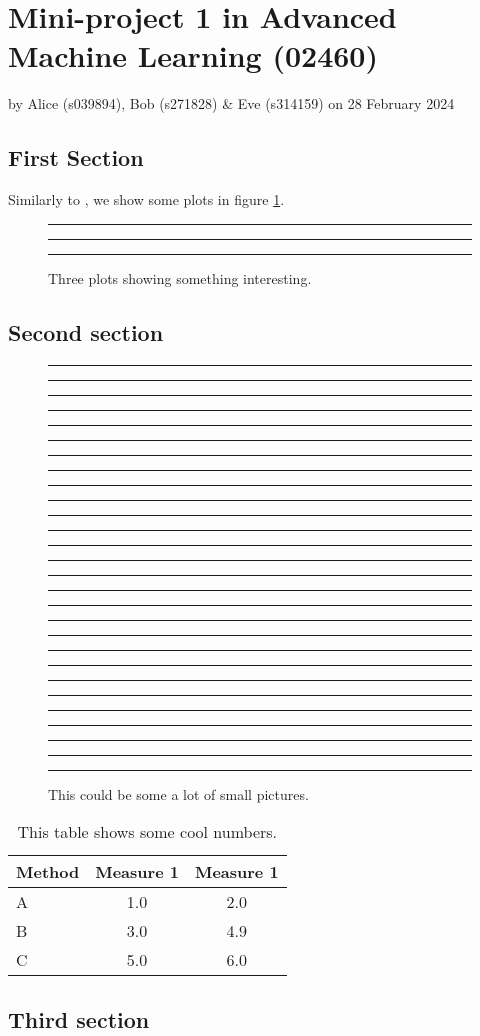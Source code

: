\documentclass[10pt,a4paper]{article}
\begin{document}

\section*{Mini-project 1 in Advanced Machine Learning (02460)}
by Alice (s039894), Bob (s271828) \& Eve (s314159) on 28 February 2024

\begin{multicols}{2}
    \subsection*{First Section}
    \lipsum[1] Similarly to \citet{tomczak2024}, we show some plots in figure \ref{fig:plots}.
    \begin{figure}[H]
        \centering
        \rule{2.5cm}{2.5cm}
        \rule{2.5cm}{2.5cm}
        \rule{2.5cm}{2.5cm}
        \caption{Three plots showing something interesting.}
        \label{fig:plots}
    \end{figure}
    \lipsum[2]

    \subsection*{Second section}
    \lipsum[3]
    \begin{figure}[H]
        \centering
        \rule{1cm}{1cm} \rule{1cm}{1cm} \rule{1cm}{1cm} \rule{1cm}{1cm} \rule{1cm}{1cm} \rule{1cm}{1cm} \rule{1cm}{1cm}
        \rule{1cm}{1cm} \rule{1cm}{1cm} \rule{1cm}{1cm} \rule{1cm}{1cm} \rule{1cm}{1cm} \rule{1cm}{1cm} \rule{1cm}{1cm}
        \rule{1cm}{1cm} \rule{1cm}{1cm} \rule{1cm}{1cm} \rule{1cm}{1cm} \rule{1cm}{1cm} \rule{1cm}{1cm} \rule{1cm}{1cm}
        \rule{1cm}{1cm} \rule{1cm}{1cm} \rule{1cm}{1cm} \rule{1cm}{1cm} \rule{1cm}{1cm} \rule{1cm}{1cm} \rule{1cm}{1cm}

        \caption{This could be some a lot of small pictures.}
    \end{figure}
    \lipsum[4]
    \begin{table}[H]
        \caption{This table shows some cool numbers.}
        \begin{center}
            \begin{tabular}{lcc}
                \toprule
                Method & Measure 1 & Measure 1 \\
                \midrule
                A & 1.0 & 2.0 \\
                B & 3.0 & 4.9 \\
                C & 5.0 & 6.0 \\
                \bottomrule
             \end{tabular}                
        \end{center}
    \end{table}

    \subsection*{Third section}
    \lipsum[4]

    \lipsum[4]
\end{multicols}
\end{document}
